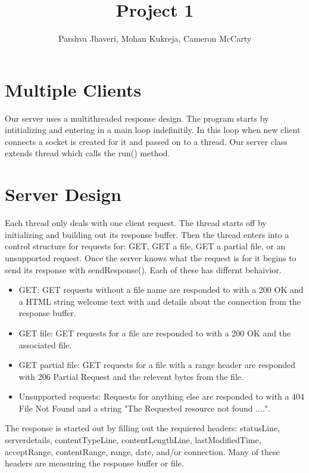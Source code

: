 \documentclass[11pt, letterpaper]{report}
\title{Project 1}
\author{Parshva Jhaveri, Mohan Kukreja, Cameron McCarty}
\begin{document}
\maketitle

\section{Multiple Clients}
Our server uses a multithreaded response design. The program starts by intitializing and entering in a main loop indefinitily. In this loop when new client connects a socket is created for it and passed on to a thread. Our server class extends thread which calls the run() method. \\

\section{Server Design}
Each thread only deals with one client request. The thread starts off by initializing and building out its response buffer. Then the thread enters into a control structure for requests for: GET, GET a file, GET a partial file, or an unsupported request. Once the server knows what the request is for it begins to send its response with sendResponse(). Each of these has differnt behaivior.

\begin{itemize}
    \item GET: GET requests without a file name are responded to with a 200 OK and a HTML string welcome text with and details about the connection from the response buffer.
    \item GET file: GET requests for a file are responded to with a 200 OK and the associated file.
    \item GET partial file: GET requests for a file with a range header are responded with 206 Partial Request and the relevent bytes from the file.
    \item Unsupported requests: Requests for anything else are responded to with a 404 File Not Found and a string "The Requested resource not found ....".
\end{itemize}

The response is started out by filling out the requiered headers: statusLine, serverdetails, contentTypeLine, contentLengthLine, lastModifiedTime, acceptRange, contentRange, range, date, and/or connection. Many of these headers are measuring the response buffer or file. \\
\end{document}
